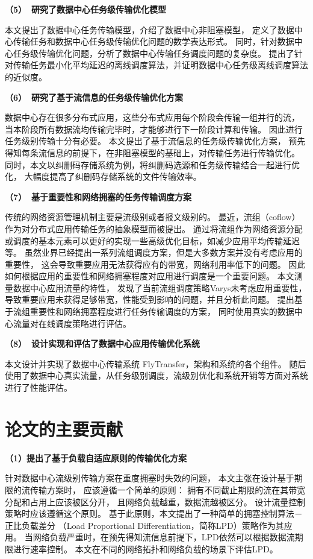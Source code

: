 \textbf{（5）~研究了数据中心任务级传输优化模型}

本文提出了数据中心任务传输模型，介绍了数据中心非阻塞模型，
定义了数据中心传输任务和数据中心任务级传输优化问题的数学表达形式。
同时，针对数据中心任务级传输优化问题，分析了数据中心传输任务调度问题的复杂度。
提出了针对传输任务最小化平均延迟的离线调度算法，并证明数据中心任务级离线调度算法的近似度。

\textbf{（6）~研究了基于流信息的任务级传输优化方案 }

数据中心存在很多分布式应用，这些分布式应用每个阶段会传输一组并行的流，
当本阶段所有数据流均传输完毕时，才能够进行下一阶段计算和传输。
因此进行任务级别传输十分有必要。
本文提出了基于流信息的任务级传输优化方案，
预先得知每条流信息的前提下，在非阻塞模型的基础上，对传输任务进行传输优化。
同时，本文以纠删码存储系统为例，将纠删码选源和任务级传输结合一起进行优化，
大幅度提高了纠删码存储系统的文件传输效率。

\textbf{（7）~基于重要性和网络拥塞的任务传输调度方案}

传统的网络资源管理机制主要是流级别或者报文级别的。
最近，流组（coflow）作为对分布式应用传输任务的抽象模型而被提出。
通过将流组作为网络资源分配或调度的基本元素可以更好的实现一些高级优化目标，如减少应用平均传输延迟等。
虽然业界已经提出一系列流组调度方案，但是大多数方案并没有考虑应用的重要性，
这会导致重要应用无法获得应有的带宽，网络利用率低下的问题。
因此如何根据应用的重要性和网络拥塞程度对应用进行调度是一个重要问题。
本文测量数据中心应用流量的特性，
发现了当前流组调度策略Varys未考虑应用重要性，导致重要应用未获得足够带宽，性能受到影响的问题，并且分析此问题。
提出基于流组重要性和网络拥塞程度进行任务传输调度的方案，
同时使用真实的数据中心流量对在线调度策略进行评估。


\textbf{（8）~设计实现和评估了数据中心应用传输优化系统}

本文设计并实现了数据中心传输系统 FlyTransfer，架构和系统的各个组件。
随后使用了数据中心真实流量，从任务级别调度，流级别优化和系统开销等方面对系统进行了性能评估。

\section{论文的主要贡献}
\textbf{（1）提出了基于负载自适应原则的传输优化方案}

针对数据中心流级别传输方案在重度拥塞时失效的问题，
本文主张在设计基于期限的流传输方案时，
应该遵循一个简单的原则：
拥有不同截止期限的流在其带宽分配和占用上应该被区分开，
且网络负载越重，数据流越被区分。
设计流量控制策略时应该遵循这个原则。
基于此原则，本文提出了一种简单的拥塞控制算法－正比负载差分
（Load Proportional Differentiation，简称LPD）策略作为其应用。
当网络负载严重时，在预先得知流信息前提下，LPD依然可以根据数据流期限进行速率控制。
本文在不同的网络拓扑和网络负载的场景下评估LPD。


